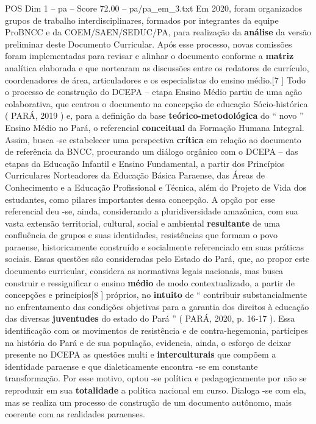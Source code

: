 \begin{textsample}{POS Dim 1 – pa – Score 72.00 – pa/pa\_em\_3.txt}
Em 2020, foram organizados grupos de trabalho interdisciplinares, formados por integrantes da equipe ProBNCC e da COEM/SAEN/SEDUC/PA, para realização da \textbf{análise} da versão preliminar deste Documento Curricular.
Após esse processo, novas comissões foram implementadas para revisar e alinhar o documento conforme a \textbf{matriz} analítica elaborada e que nortearam as discussões entre os redatores de currículo, coordenadores de área, articuladores e os especialistas do ensino médio.[7 ] Todo o processo de construção do DCEPA – etapa Ensino Médio partiu de uma ação colaborativa, que centrou o documento na concepção de educação Sócio-histórica ( PARÁ, 2019 ) e, para a definição da base \textbf{teórico-metodológica} do “ novo ” Ensino Médio no Pará, o referencial \textbf{conceitual} da Formação Humana Integral.
Assim, busca -se estabelecer uma perspectiva \textbf{crítica} em relação ao documento de referência da BNCC, procurando um diálogo orgânico com o DCEPA – das etapas da Educação Infantil e Ensino Fundamental, a partir dos Princípios Curriculares Norteadores da Educação Básica Paraense, das Áreas de Conhecimento e a Educação Profissional e Técnica, além do Projeto de Vida dos estudantes, como pilares importantes dessa concepção.
A opção por esse referencial deu -se, ainda, considerando a pluridiversidade amazônica, com sua vasta extensão territorial, cultural, social e ambiental \textbf{resultante} de uma confluência de grupos e suas identidades, resistências que formam o povo paraense, historicamente construído e socialmente referenciado em suas práticas sociais.
Essas questões são consideradas pelo Estado do Pará, que, ao propor este documento curricular, considera as normativas legais nacionais, mas busca construir e ressignificar o ensino \textbf{médio} de modo contextualizado, a partir de concepções e princípios[8 ] próprios, no \textbf{intuito} de “ contribuir substancialmente no enfrentamento das condições objetivas para a garantia dos direitos à educação das diversas \textbf{juventudes} do estado do Pará ” ( PARÁ, 2020, p. 16-17 ).
Essa identificação com os movimentos de resistência e de contra-hegemonia, partícipes na história do Pará e de sua população, evidencia, ainda, o esforço de deixar presente no DCEPA as questões multi e \textbf{interculturais} que compõem a identidade paraense e que dialeticamente encontra -se em constante transformação.
Por esse motivo, optou -se política e pedagogicamente por não se reproduzir em sua \textbf{totalidade} a política nacional em curso.
Dialoga -se com ela, mas se realiza um processo de construção de um documento autônomo, mais coerente com as realidades paraenses.

\end{textsample}
